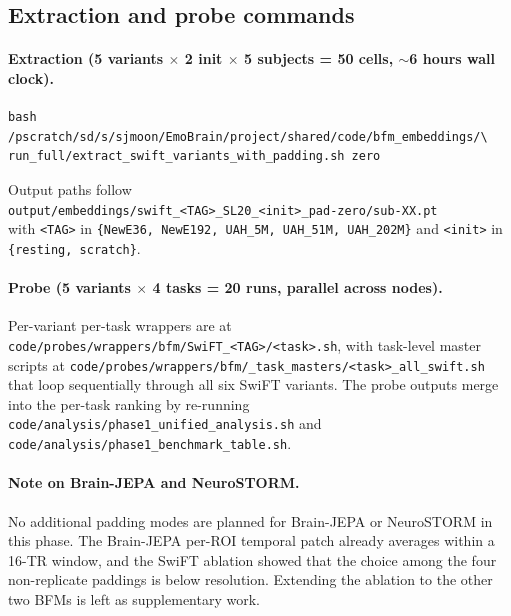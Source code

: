 \documentclass[11pt, a4paper]{article}
\newcommand{\fefn}[1]{\texttt{\small #1}}
\begin{document}
\subsection{Extraction and probe commands}

\paragraph{Extraction (5 variants $\times$ 2 init $\times$ 5 subjects = 50 cells, $\sim$6 hours wall clock).}
\begin{verbatim}
bash /pscratch/sd/s/sjmoon/EmoBrain/project/shared/code/bfm_embeddings/\
run_full/extract_swift_variants_with_padding.sh zero
\end{verbatim}
Output paths follow\\
\fefn{output/embeddings/swift\_<TAG>\_SL20\_<init>\_pad-zero/sub-XX.pt}\\
with \fefn{<TAG>} in \fefn{\{NewE36, NewE192, UAH\_5M, UAH\_51M, UAH\_202M\}} and
\fefn{<init>} in \fefn{\{resting, scratch\}}.

\paragraph{Probe (5 variants $\times$ 4 tasks = 20 runs, parallel across nodes).}
Per-variant per-task wrappers are at
\fefn{code/probes/wrappers/bfm/SwiFT\_<TAG>/<task>.sh}, with task-level master scripts at
\fefn{code/probes/wrappers/bfm/\_task\_masters/<task>\_all\_swift.sh} that loop sequentially
through all six SwiFT variants. The probe outputs merge into the per-task ranking by
re-running \fefn{code/analysis/phase1\_unified\_analysis.sh} and
\fefn{code/analysis/phase1\_benchmark\_table.sh}.

\paragraph{Note on Brain-JEPA and NeuroSTORM.}
No additional padding modes are planned for Brain-JEPA or NeuroSTORM in this phase. The
Brain-JEPA per-ROI temporal patch already averages within a 16-TR window, and the SwiFT
ablation showed that the choice among the four non-replicate paddings is below resolution.
Extending the ablation to the other two BFMs is left as supplementary work.
\end{document}
